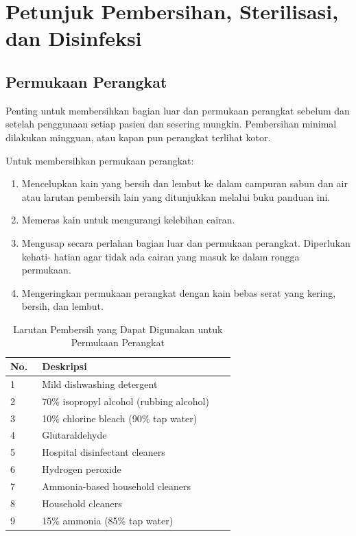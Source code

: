 \documentclass[11pt,a4paper,twoside,onecolumn]{book}
\begin{document}
	\newpage
	
	\chapter{Petunjuk Pembersihan, Sterilisasi, dan Disinfeksi}
		\section{Permukaan Perangkat}
		Penting untuk membersihkan bagian luar dan permukaan perangkat sebelum dan setelah penggunaan setiap pasien dan sesering mungkin. Pembersihan minimal dilakukan mingguan, atau kapan pun perangkat terlihat kotor.
		
		Untuk membersihkan permukaan perangkat:
		\begin{enumerate}
			\item Mencelupkan kain yang bersih dan lembut ke dalam campuran sabun dan air atau larutan pembersih lain yang ditunjukkan melalui buku panduan ini.
			\item Memeras kain untuk mengurangi kelebihan cairan.
			\item Mengusap secara perlahan bagian luar dan permukaan perangkat. Diperlukan kehati- hatian agar tidak ada cairan yang masuk ke dalam rongga permukaan.
			\item Mengeringkan permukaan perangkat dengan kain bebas serat yang kering, bersih, dan lembut.
		\end{enumerate}
		
		\begin{table}[H]
			\centering
			\caption{Larutan Pembersih yang Dapat Digunakan untuk Permukaan Perangkat}
			\label{tab:7.1}
			\begin{tabular}{|p{0.05\linewidth}  | p{0.6\linewidth}|}
				\hline
				No. & Deskripsi \\
				\hline
				\hline
				1 & Mild dishwashing detergent\\
				\hline
				2 & 70\% isopropyl alcohol (rubbing alcohol)\\
				\hline
				3 & 10\% chlorine bleach (90\% tap water)\\
				\hline
				4 & Glutaraldehyde\\
				\hline
				5 & Hospital disinfectant cleaners\\
				\hline
				6 & Hydrogen peroxide\\
				\hline
				7 & Ammonia-based household cleaners\\
				\hline
				8 & Household cleaners\\
				\hline
				9 & 15\% ammonia (85\% tap water)\\
				\hline
			\end{tabular}
		\end{table}
		
\end{document}
